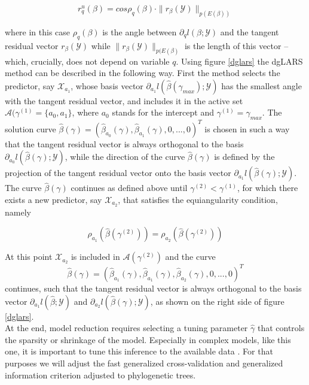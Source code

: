 	$$ r_q^u (\beta) = cos \rho_q (\beta) \cdot \| r_{\beta} (\mathcal{Y}) \|_{p(E(\beta))} $$
	
	where in this case $\rho_q(\beta)$ is the angle between $\partial_q l(\beta;\mathcal{Y})$ and the tangent residual vector $r_{\beta}(\mathcal{Y})$ while  $\| r_{\beta} (\mathcal{Y})\|_{p(E(\beta)}$ is the length of this vector -- which, crucially, does not depend on variable $q$. Using figure \ref{dglars} the dgLARS method can be described in the following way. First the method selects the predictor, say $\mathcal{X}_{a_1}$, whose basis vector $\partial_{a_1} l(\hat{\beta}(\gamma_{max});\mathcal{Y})$ has the smallest angle with the tangent residual vector, and includes it in the active set $\mathcal{A}(\gamma^{(1)} = \{ a_0, a_1 \}$, where $a_0$ stands for the intercept and $\gamma^{(1)} = \gamma_{max}$. The solution curve $\hat{\beta} (\gamma) = (\hat{\beta}_{a_0}(\gamma), \hat{\beta}_{a_1}(\gamma),0,...,0)^T$ is chosen in such a way that the tangent residual vector is always orthogonal to the basis $\partial_{a_0}l(\hat{\beta}(\gamma);\mathcal{Y})$, while the direction of the curve $\hat{\beta}(\gamma)$ is defined by the projection of the tangent residual vector onto the basis vector $\partial_{a_1} l(\hat{\beta}(\gamma);\mathcal{Y})$. The curve $\hat{\beta}(\gamma)$ continues as defined above until $\gamma^{(2)} < \gamma^{(1)}$, for which there exists a new predictor, say $\mathcal{X}_{a_2}$, that satisfies the equiangularity condition, namely 
	
	\begin{equation} \rho_{a_1}(\hat{\beta}(\gamma^{(2)})) = \rho_{a_2}(\hat{\beta}(\gamma^{(2)})) \label{le} \end{equation}
	
At this point $\mathcal{X}_{a_2}$ is included in $\mathcal{A}(\gamma^{(2)})$ and the curve $$\hat{\beta}(\gamma) = (\hat{\beta}_{a_1}(\gamma),\hat{\beta}_{a_1}(\gamma),\hat{\beta}_{a_2}(\gamma),0,...,0)^T$$ continues, such that the tangent residual vector is always orthogonal to the basis vector $\partial_{a_1} l(\hat{\beta};\mathcal{Y})$ and $\partial_{a_2} l(\hat{\beta}(\gamma);\mathcal{Y})$, as shown on the right side of figure \ref{dglars}.\\

At the end, model reduction requires selecting a tuning parameter $\hat{\gamma}$ that controls the sparsity or shrinkage of the model. Especially in complex models, like this one, it is important to tune this inference to the available data \cite{wit2012all}. For that purposes we will adjust the fast generalized cross-validation and generalized information criterion \cite{abbruzzo2014generalized} \cite{2013arXiv1309.6216V} adjusted to phylogenetic trees.

